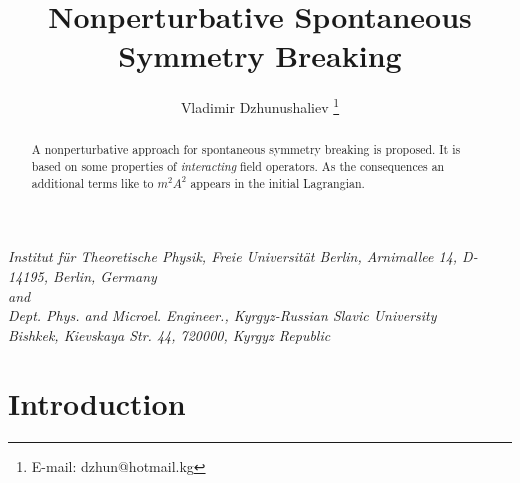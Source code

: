 \documentclass[a4paper,a4paper]{article}
\title{Nonperturbative Spontaneous Symmetry Breaking}
\author{Vladimir Dzhunushaliev
\thanks{
E-mail: dzhun@hotmail.kg}}
\begin{document}
\maketitle

\begin{center}
\textit{
Institut f\"ur Theoretische Physik,  
Freie Universit\"at Berlin, Arnimallee 14, D-14195, Berlin, Germany\\
and \\
Dept. Phys. and Microel. Engineer., Kyrgyz-Russian
Slavic University\\
Bishkek, Kievskaya Str. 44, 720000, Kyrgyz
Republic}
\end{center}

\begin{abstract}
A nonperturbative approach for  spontaneous symmetry breaking 
is proposed. It is based on some properties of \textit{interacting} field 
operators. As the consequences an additional terms like to 
$m^2 A^2$ appears in the initial Lagrangian. 
\end{abstract}

\section{Introduction}
\end{document}
